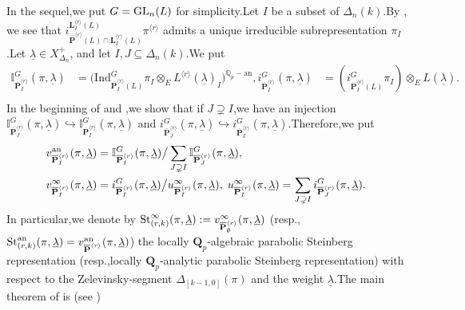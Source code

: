\documentclass[SecEq,CM,GP]{degruyter-crelle} %
\theoremstyle{plain}
\newcommand{\ana}{{\rm an}}
\newcommand{\GL}{{\rm GL}}
\newcommand{\lrr}{{\langle r\rangle}}
\newcommand{\op}{{\overline{{\mathbf{P}}}}}
\newcommand{\st}{{\rm St}}
\newcommand{\ul}{\underline}
\newcommand{\BI}{{\mathbb{I}}}
\newcommand{\bL}{{\mathbf{L}}}
\newcommand{\bQ}{{\mathbf{Q}}}
\begin{document}
In the sequel,\;we put  $G=\GL_n(L)$ for simplicity.\;Let $I$ be a subset of ${\Delta_n(k)}$.\;By \cite[Proposition 2.10]{av1980induced2}, we see that $i_{\op^{\lrr}(L)\cap\bL^{\lrr}_{I}(L)}^{\bL^{\lrr}_{I}(L)}\pi^{\lrr}$ admits a unique irreducible subrepresentation $\pi_I$.\;Let $\underline{\lambda}\in X_{\Delta_{n}}^+$, and let $I,J\subseteq {\Delta_n(k)}$.\;We put
\begin{equation*}
\begin{aligned}
	\mathbb{I}_{\op^{\lrr}_{{I}}}^{G}(\pi,\underline{\lambda})&=\Big(\mathrm{Ind}_{\op^{\lrr}_{{I}}(L)}^{G}\pi_I\otimes_EL^{\lrr}(\underline{\lambda})_{I}\Big)^{\mathbb{Q}_p-\mathrm{an}},
	i_{\op^{\lrr}_{{I}}}^{G}(\pi,\underline{\lambda})&=\left(i_{\op^{\lrr}_{{I}}(L)}^{G}\pi_{I}\right)\otimes_EL(\underline{\lambda}).\\
\end{aligned}
\end{equation*}
In the beginning of  \cite[Section 4.2]{2022ext1hyq} and \cite[Proposition 3.6]{2022ext1hyq},\;we show that if $J\supsetneq I$,\;we have an injection $\BI_{\op^{\lrr}_{{J}}}^{G}(\pi,\underline{\lambda})\hookrightarrow\BI_{\op^{\lrr}_{{I}}}^{G}(\pi,\underline{\lambda})$ and $i_{\op^{\lrr}_{{J}}}^{G}(\pi,\underline{\lambda})\hookrightarrow i_{\op^{\lrr}_{{I}}}^{G}(\pi,\underline{\lambda})$.\;Therefore,\;we put
\begin{equation*}
\begin{aligned}
	&v_{\op^{\lrr}_{{I}}}^{\ana}(\pi,\underline{\lambda})=\BI_{\op^{\lrr}_{{I}}}^{G}(\pi,\underline{\lambda})\big/\sum_{J\supsetneq I}\BI_{\op^{\lrr}_{{J}}}^{G}(\pi,\underline{\lambda}),\;\\
	&v_{\op^{\lrr}_{{I}}}^{\infty}(\pi,\underline{\lambda})=i_{\op^{\lrr}_{{I}}}^{G}(\pi,\underline{\lambda})\big/u_{\op^{\lrr}_{{I}}}^{\infty}(\pi,\underline{\lambda}),\;	u_{\op^{\lrr}_{{I}}}^{\infty}(\pi,\underline{\lambda})=\sum_{J\supsetneq I}i_{\op^{\lrr}_{{J}}}^{G}(\pi,\underline{\lambda}).\;
\end{aligned}
\end{equation*}
In particular,\;we denote by $\st_{(r,k)}^{\infty}(\pi,\underline{\lambda}):=v^{\infty}_{\op^{\lrr}_{\emptyset}}(\pi,\underline{\lambda})$ (resp.,\;$\st_{(r,k)}^{\ana}(\pi,\underline{\lambda})=v^{\ana}_{\op^{\lrr}}(\pi,\underline{\lambda})$) the locally $\bQ_p$-algebraic parabolic Steinberg representation (resp.,\;locally $\bQ_p$-analytic  parabolic Steinberg representation) with respect to the Zelevinsky-segment $\Delta_{[k-1,0]}(\pi)$ and the weight $\underline{\lambda}$.\;The main theorem of \cite{2022ext1hyq} is (see \cite[Theorem 5.19]{2022ext1hyq})
\end{document}

